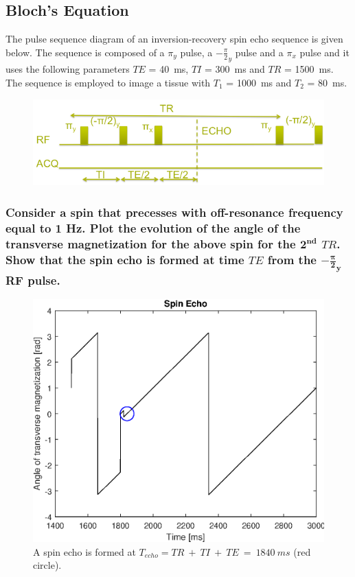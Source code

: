 \subsection{Bloch's Equation}
The pulse sequence diagram of an inversion-recovery spin echo sequence is given below.
The sequence is composed of a $\pi_y$ pulse, a $-\frac{\pi}{2}_y$ pulse and a $\pi_x$ pulse and it uses the
following parameters $TE$ = \SI{40}{\milli\s}, $TI$ = \SI{300}{\milli\s} and $TR$ = \SI{1500}{\milli\s}. The sequence is
employed to image a tissue with $T_1$ = \SI{1000}{\milli\s} and $T_2$ = \SI{80}{\milli\s}.
\begin{figure}[h!]
    \centering
    \includegraphics{./homework4/img/pulse_sequence.png}
    \caption{}
    \label{fig:my_label}
\end{figure}




\subsubsection{Consider a spin that precesses with off-resonance frequency equal to 1 Hz. Plot the
evolution of the angle of the transverse magnetization for the above spin for the $\mathbf{2^{nd}}$ $TR$.
Show that the spin echo is formed at time $TE$ from the $\mathbf{-\frac{\pi}{2}_y}$ RF pulse.}

\begin{figure}[h!]
\centering
    \includegraphics[width=\linewidth]{./homework4/img/Spin_Echo.eps}
    \caption{A spin echo is formed at $T_{echo} = TR\ +\ TI\ +\ TE\ =\ 1840\ ms$ (red circle).}
    \label{fig:spin_echo}
\end{figure}


